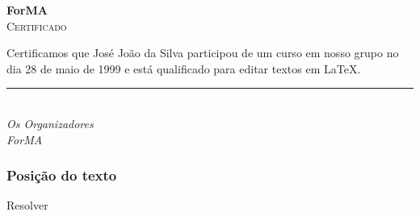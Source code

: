 \begin{frame}[plain]
  \begin{center}
    {\huge\textbf{ForMA}}\\[2em]
    {\LARGE\textsc{Certificado}}
  \end{center}

    \noindent Certificamos que José João da Silva participou de um curso em
    nosso grupo no dia 28 de maio de 1999 e está qualificado para editar textos
    em \LaTeX.

    \vfill
    \begin{flushright}
      \rule{}{.4pt}\\
      \emph{Os Organizadores}\\
      \emph{ForMA}\\
    \end{flushright}
\end{frame}

\begin{frame}
  \frametitle{Posição do texto}
  \huge
  Resolver 
\end{frame}
